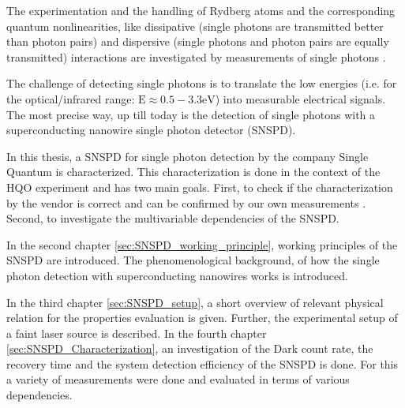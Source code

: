 The experimentation and the handling of Rydberg atoms and the corresponding quantum nonlinearities, like dissipative (single
photons are transmitted better than photon pairs) and dispersive (single photons and photon pairs are equally transmitted)
interactions are investigated by measurements of single photons \cite{firstenberg-2016}.

The challenge of detecting single photons is to translate the low energies (i.e. for the optical/infrared
range: $\text{E} \approx 0.5 - 3.3 \si{\eV}$) into measurable electrical signals.
The most precise way, up till today is the detection of single photons with a superconducting nanowire single photon detector (SNSPD).

In this thesis, a SNSPD for single photon detection by the company Single Quantum is characterized.
This characterization is done in the context of the HQO experiment and has two main goals.
First, to check if the characterization by the vendor is correct and can be confirmed by our own measurements \cite{tech_sheet_single_quantum}.
Second, to investigate the multivariable dependencies of the SNSPD.

In the second chapter \ref{sec:SNSPD_working_principle}, working principles of the SNSPD are introduced.
The phenomenological background, of how the single photon detection  with superconducting
nanowires works is introduced.

In the third chapter \ref{sec:SNSPD_setup}, a short overview of relevant physical relation for the properties evaluation is given.
Further, the experimental setup of a faint laser source is described.
In the fourth chapter \ref{sec:SNSPD_Characterization}, an investigation of the Dark count rate, the recovery time and the system detection efficiency of the SNSPD is done.
For this a variety of measurements were done and evaluated in terms of various dependencies.

